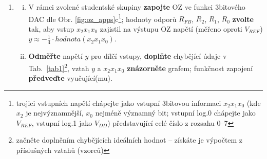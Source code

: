 \documentclass[a4paper, 11pt]{report}
\begin{document}
\begin{enumerate}[\bf {Experiment} 1:]
\vspace{-1mm}
\item 
\begin{enumerate}[i)]
\item
V rámci zvolené studentské skupiny 
{\bf zapojte} OZ ve funkci 3bitového DAC
dle Obr. \ref{fig:oz_apps}c\footnote{trojici vstupních napětí 
chápejte jako vstupní 3bitovou informaci 
$x_2x_1x_0$ (kde 
$x_2$ 
je
nejvýznamnější,
$x_0$ nejméně významný bit;
vstupní log.0 chápejte jako $V_{REF}$, vstupní log.1 jako $V_{DD}$)
představující celé číslo z rozsahu 0--7};
hodnoty odporů 
$R_{FB}$,
$R_{2}$,
$R_{1}$,
$R_{0}$
{\bf zvolte} tak, aby 
vstup 
$x_2x_1x_0$
zajistil na výstupu OZ napětí (měřeno oproti $V_{REF}$) 
$y \approx - \frac{1}{4}\cdot hodnota(x_2x_1x_0)$.
\item
{\bf Odměřte} napětí $y$ pro dílčí vstupy, 
{\bf doplňte} chybějící údaje
v Tab.~\ref{tab1}\footnote{začněte doplněním chybějících ideálních hodnot -- získáte je výpočtem z příslušných vztahů (vzorců)},
vztah $y$ a $x_2x_1x_0$ {\bf znázorněte} grafem;
funkčnost zapojení {\bf předveďte} vyučující(mu).

\end{enumerate}




\vspace{-2mm}
\begin{table}[h]
\centering

\scalebox{0.7}{

}
\end{table}
\end{enumerate}
\end{document}
